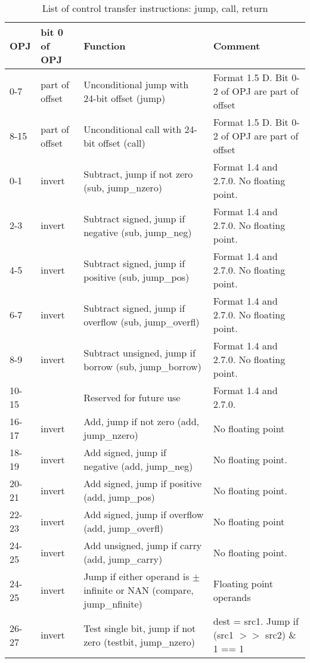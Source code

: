 \documentclass[forwardcom.tex]{subfiles}
\begin{document}
\begin{longtable}
{|p{10mm}|p{11mm}|p{50mm}|p{35mm}|}
\caption{List of control transfer instructions: jump, call, return}
\label{table:controlTransferInstructions}
\endfirsthead
\endhead
\hline
OPJ & bit 0 \newline of OPJ & Function & Comment \\
\hline
0-7 & part of offset & Unconditional jump with 24-bit offset (jump) & Format 1.5 D. \newline Bit 0-2 of OPJ are part of offset \\
\hline
8-15 & part of offset & Unconditional call with 24-bit offset (call) & Format 1.5 D. \newline Bit 0-2 of OPJ are part of offset \\
\hline
0-1 & invert & Subtract, jump if not zero (sub, jump\_nzero) & Format 1.4 and 2.7.0. No floating point. \\
\hline
2-3 & invert & Subtract signed, jump if negative (sub, jump\_neg) & Format 1.4 and 
    2.7.0. No floating point. \\
\hline
4-5 & invert & Subtract signed, jump if positive (sub, jump\_pos) & Format 1.4 and 2.7.0.
    No floating point. \\
\hline
6-7 & invert & Subtract signed, jump if overflow (sub, jump\_overfl) & Format 1.4 and 2.7.0. No floating point. \\
\hline
8-9 & invert & Subtract unsigned, jump if borrow (sub, jump\_borrow) & Format 1.4 and 2.7.0. No floating point. \\
\hline

10-15 & & Reserved for future use & Format 1.4 and 2.7.0. \\
\hline

16-17 & invert & Add, jump if not zero (add, jump\_nzero) & No floating point \\
\hline
18-19 & invert & Add signed, jump if negative (add, jump\_neg) & No floating point. \\
\hline
20-21 & invert & Add signed, jump if positive (add, jump\_pos) & No floating point. \\
\hline
22-23 & invert & Add signed, jump if overflow (add, jump\_overfl) & No floating point  \\
\hline
24-25 & invert & Add unsigned, jump if carry (add, jump\_carry) & No floating point. \\
\hline

24-25 & invert & Jump if either operand is $\pm$ infinite or NAN (compare, jump\_nfinite) & Floating point operands \\
\hline
26-27 & invert & Test single bit, jump if not zero (testbit, jump\_nzero) & dest = src1. Jump if (src1 $>>$ src2) \& 1 == 1 \\
\hline


\end{longtable}
\end{document}
